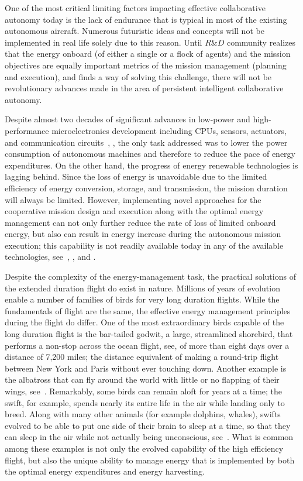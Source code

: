 \documentclass{ifacconf}
\begin{document}
One of the most critical limiting factors impacting effective collaborative autonomy today is the lack of endurance that is typical in most of the existing autonomous aircraft. Numerous futuristic ideas and concepts will not be implemented in real life solely due to this reason. Until $R\&D$ community realizes that the energy onboard (of either a single or a flock of agents) and the mission objectives are equally important metrics of the mission management (planning and execution), and finds a way of solving this challenge, there will not be revolutionary advances made in the area of persistent intelligent collaborative autonomy.

Despite almost two decades of significant advances in low-power and high-performance microelectronics development including CPUs, sensors, actuators, and communication circuits~\cite{Tong:1995}, \cite{Singh:2010}, the only task addressed was to lower the power consumption of autonomous machines and therefore to reduce the pace of energy expenditures. On the other hand, the progress of energy renewable technologies is lagging behind. Since the loss of energy is unavoidable due to the limited efficiency of energy conversion, storage, and transmission, the mission duration will always be limited. However, implementing novel approaches for the cooperative mission design and execution along with the optimal energy management can not only further reduce the rate of loss of limited onboard energy, but also can result in energy increase during the autonomous mission execution; this capability is not readily available today in any of the available technologies, see~\cite{Siciliano:2008}, \cite{Martinez:2008}, and \cite{Nonami:2013}.

Despite the complexity of the energy-management task, the practical solutions of the extended duration flight do exist in nature. Millions of years of evolution enable a number of families of birds for very long duration flights. While the fundamentals of flight are the same, the effective energy management principles during the flight do differ. One of the most extraordinary birds capable of the long duration flight is the bar-tailed godwit, a large, streamlined shorebird, that performs a non-stop across the ocean flight, see\cite{USGS:2007}, of more than eight days over a distance of 7,200 miles; the distance equivalent of making a round-trip flight between New York and Paris without ever touching down. Another example is the albatross that can fly around the world with little or no flapping of their wings, see~\cite{Richardson:2011}. Remarkably, some birds can remain aloft for years at a time; the swift, for example, spends nearly its entire life in the air while landing only to breed. Along with many other animals (for example dolphins, whales), swifts evolved to be able to put one side of their brain to sleep at a time, so that they can sleep in the air while not actually being unconscious, see~\cite{Lapierre:2007}. What is common among these examples is not only the evolved capability of the high efficiency flight, but also the unique ability to manage energy that is implemented by both the optimal energy expenditures and energy harvesting.
\end{document}
